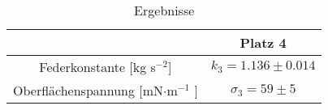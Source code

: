 \begin{table}[ht!]
	\centering
	\caption{Ergebnisse}
	\begin{tabular}{|c|c|}
		\hline
		& Platz 4 \\
		\hline
		Federkonstante [kg s$ ^{-2} $]& $k_{3}=1.136\pm 0.014  $ \\
		\hline
		Oberflächenspannung [mN$ \cdot $m$ ^{-1} $ ]& $\sigma_{3}= 59\pm 5 $ \\
		\hline
	\end{tabular}
	\label{tab: Erg 3}
\end{table}